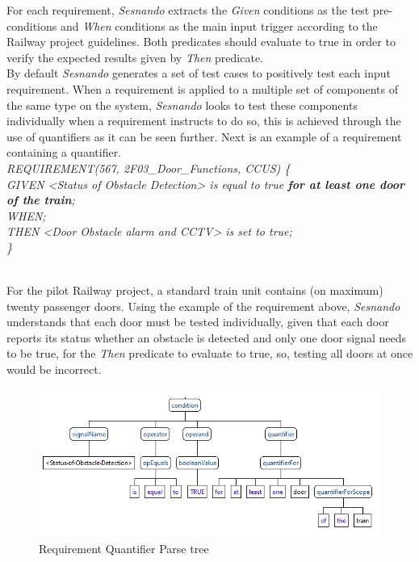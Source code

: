 For each requirement, \textit{Sesnando} extracts the \textit{Given} conditions as the test pre-conditions and \textit{When} conditions as the main input trigger according to the Railway project guidelines. Both predicates should evaluate to true in order to verify the expected results given by \textit{Then} predicate.\\

By default \textit{Sesnando} generates a set of test cases to positively test each input requirement. When a requirement is applied to a multiple set of components of the same type on the system, \textit{Sesnando} looks to test these components individually when a requirement instructs to do so, this is achieved through the use of quantifiers as it can be seen further. Next is an example of a requirement containing a quantifier.\\

\textit{
REQUIREMENT(567, 2F03\_Door\_Functions, CCUS) 
\{\\
	GIVEN <Status of Obstacle Detection> is equal to true \textbf{for at least one door of the train};\\
	WHEN;\\
	THEN <Door Obstacle alarm and CCTV> is set to true;\\
\}\\
}\\
\label{eq:requirement_quantifier}

For the pilot Railway project, a standard train unit contains (on maximum) twenty passenger doors. Using the example of the requirement above, \textit{Sesnando} understands that each door must be tested individually, given that each door reports its status whether an obstacle is detected and only one door signal needs to be true, for the \textit{Then} predicate to evaluate to true, so, testing all doors at once would be incorrect.\\

\begin{figure}[H]
    \centering
    \includegraphics[scale=0.85]{images/quantifier_parse_tree.PNG}
    \caption{Requirement Quantifier Parse tree}
    \label{fig:quantifier_parse_tree}
\end{figure}

